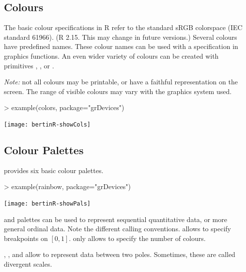 \documentclass[nogin, dvips,12pt,a4paper,twoside]{amsart}
\begin{document}
\pagebreak

\subsection{Colours}

The basic colour specifications in R refer to the standard sRGB colorspace (IEC standard 61966). (R 2.15. This may change in future versions.) Several colours have predefined names. 
These colour names can be used with a  specification in graphics functions.
An even wider variety of colours can be created with primitives , , or .

\emph{Note:} not all colours may be printable, or have a faithful representation on the screen. The range of visible colours may vary with the graphics system used.


\begin{Schunk}
\begin{Sinput}
> example(colors, package="grDevices")
\end{Sinput}
\end{Schunk}
\texttt{[image: bertinR-showCols]}

\clearpage
\subsection{Colour Palettes}
\R{} provides six basic colour palettes.
\begin{Schunk}
\begin{Sinput}
> example(rainbow, package="grDevices")
\end{Sinput}
\end{Schunk}

\begin{center}
\texttt{[image: bertinR-showPals]}
\end{center}

 and  palettes can be used to represent sequential quantitative data, or 
more general ordinal data. Note the different calling conventions.   allows to specify breakpoints on $[0, 1]$.   only allows to specify the number of colours.

, , and  allow to represent data between two poles. Sometimes, these are called divergent scales.
\end{document}
